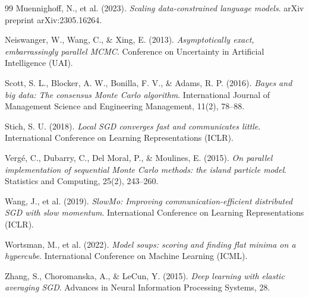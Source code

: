 \documentclass[11pt]{article}
\begin{document}
\begin{thebibliography}{99}
Muennighoff, N., et al. (2023). 
\textit{Scaling data-constrained language models}. 
arXiv preprint arXiv:2305.16264.

Neiswanger, W., Wang, C., \& Xing, E. (2013). 
\textit{Asymptotically exact, embarrassingly parallel MCMC}. 
Conference on Uncertainty in Artificial Intelligence (UAI).

Scott, S. L., Blocker, A. W., Bonilla, F. V., \& Adams, R. P. (2016). 
\textit{Bayes and big data: The consensus Monte Carlo algorithm}. 
International Journal of Management Science and Engineering Management, 11(2), 78--88.

Stich, S. U. (2018). 
\textit{Local SGD converges fast and communicates little}. 
International Conference on Learning Representations (ICLR).

Vergé, C., Dubarry, C., Del Moral, P., \& Moulines, E. (2015). 
\textit{On parallel implementation of sequential Monte Carlo methods: the island particle model}. 
Statistics and Computing, 25(2), 243--260.

Wang, J., et al. (2019). 
\textit{SlowMo: Improving communication-efficient distributed SGD with slow momentum}. 
International Conference on Learning Representations (ICLR).

Wortsman, M., et al. (2022). 
\textit{Model soups: scoring and finding flat minima on a hypercube}. 
International Conference on Machine Learning (ICML).

Zhang, S., Choromanska, A., \& LeCun, Y. (2015). 
\textit{Deep learning with elastic averaging SGD}. 
Advances in Neural Information Processing Systems, 28.

\end{thebibliography}
\end{document}
